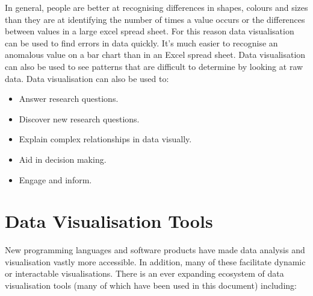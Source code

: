 \documentclass[
]{book}
\providecommand{\tightlist}{%
  \setlength{\itemsep}{0pt}\setlength{\parskip}{0pt}}
\begin{document}
In general, people are better at recognising differences in shapes, colours and sizes than they are at identifying the number of times a value occurs or the differences between values in a large excel spread sheet. For this reason data visualisation can be used to find errors in data quickly. It's much easier to recognise an anomalous value on a bar chart than in an Excel spread sheet. Data visualisation can also be used to see patterns that are difficult to determine by looking at raw data.
Data visualisation can also be used to:

\begin{itemize}
\tightlist
\item
  Answer research questions.
\item
  Discover new research questions.
\item
  Explain complex relationships in data visually.
\item
  Aid in decision making.
\item
  Engage and inform.
\end{itemize}

\hypertarget{data-visualisation-tools}{%
\section{Data Visualisation Tools}\label{data-visualisation-tools}}

New programming languages and software products have made data analysis and visualisation vastly more accessible. In addition, many of these facilitate dynamic or interactable visualisations. There is an ever expanding ecosystem of data visualisation tools (many of which have been used in this document) including:
\end{document}

